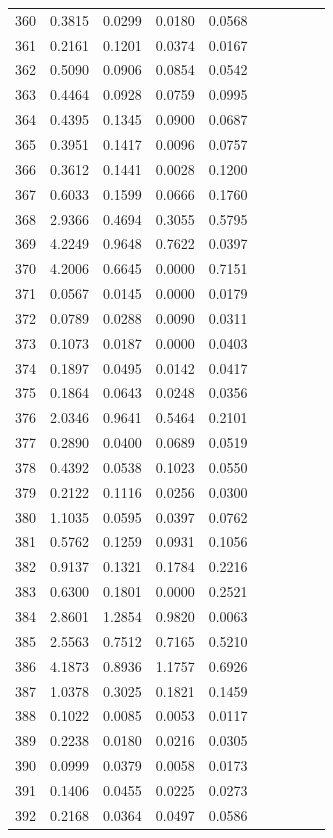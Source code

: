 \begin{table}
\begin{tabular}{cccccccccc}
360& 0.3815& 0.0299& 0.0180& 0.0568\\ 
361& 0.2161& 0.1201& 0.0374& 0.0167\\ 
362& 0.5090& 0.0906& 0.0854& 0.0542\\ 
363& 0.4464& 0.0928& 0.0759& 0.0995\\ 
364& 0.4395& 0.1345& 0.0900& 0.0687\\ 
365& 0.3951& 0.1417& 0.0096& 0.0757\\ 
366& 0.3612& 0.1441& 0.0028& 0.1200\\ 
367& 0.6033& 0.1599& 0.0666& 0.1760\\ 
368& 2.9366& 0.4694& 0.3055& 0.5795\\ 
369& 4.2249& 0.9648& 0.7622& 0.0397\\ 
370& 4.2006& 0.6645& 0.0000& 0.7151\\ 
371& 0.0567& 0.0145& 0.0000& 0.0179\\ 
372& 0.0789& 0.0288& 0.0090& 0.0311\\ 
373& 0.1073& 0.0187& 0.0000& 0.0403\\ 
374& 0.1897& 0.0495& 0.0142& 0.0417\\ 
375& 0.1864& 0.0643& 0.0248& 0.0356\\ 
376& 2.0346& 0.9641& 0.5464& 0.2101\\ 
377& 0.2890& 0.0400& 0.0689& 0.0519\\ 
378& 0.4392& 0.0538& 0.1023& 0.0550\\ 
379& 0.2122& 0.1116& 0.0256& 0.0300\\ 
380& 1.1035& 0.0595& 0.0397& 0.0762\\ 
381& 0.5762& 0.1259& 0.0931& 0.1056\\ 
382& 0.9137& 0.1321& 0.1784& 0.2216\\ 
383& 0.6300& 0.1801& 0.0000& 0.2521\\ 
384& 2.8601& 1.2854& 0.9820& 0.0063\\ 
385& 2.5563& 0.7512& 0.7165& 0.5210\\ 
386& 4.1873& 0.8936& 1.1757& 0.6926\\ 
387& 1.0378& 0.3025& 0.1821& 0.1459\\ 
388& 0.1022& 0.0085& 0.0053& 0.0117\\ 
389& 0.2238& 0.0180& 0.0216& 0.0305\\ 
390& 0.0999& 0.0379& 0.0058& 0.0173\\ 
391& 0.1406& 0.0455& 0.0225& 0.0273\\ 
392& 0.2168& 0.0364& 0.0497& 0.0586\\ 

\end{tabular}
\end{table}
